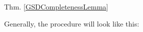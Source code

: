 \begin{PROOFOF}{Thm. \ref{GSDCompletenessLemma}}















Generally, the procedure will look like this:


\end{PROOFOF}
